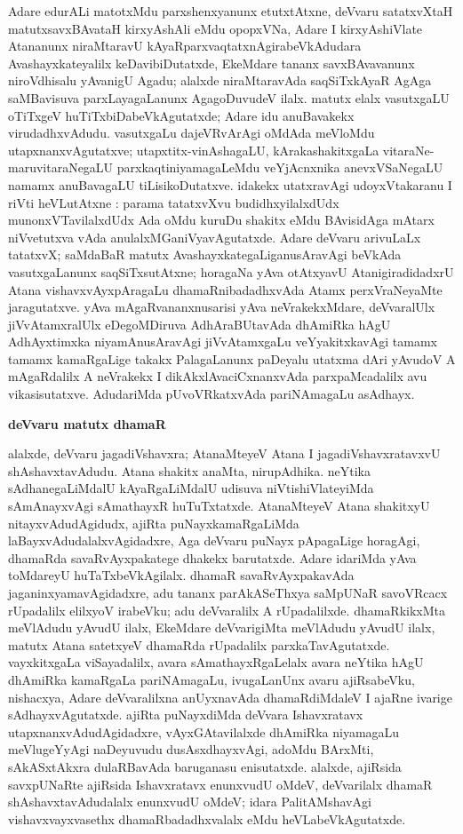 Adare edurALi matotxMdu parxshenxyanunx etutxtAtxne, deVvaru satatxvXtaH matutx\break savxBA\-vataH kirxyAshAli eMdu opopxVNa, Adare I kirxyAshiVlate Atananunx niraMta\-ravU kAyaR\-parxvaqtatxnAgirabeVkAdudara Avashayxkateyalilx keDavibiDutatxde, EkeMdare tananx savxBAvavanunx niroVdhisalu yAvanigU Agadu; alalxde niraMtaravAda saqSiTxkAyaR AgAga saMBavisuva parxLayagaLanunx AgagoDuvudeV ilalx. matutx elalx vasutxgaLU oTiTxgeV huTiTx\-biDabeVkAgutatxde; Adare idu anuBavakekx virudadhxvAdudu. vasutxgaLu dajeVRvArAgi oMdAda meVloMdu utapxnanxvAgutatxve; utapxtitx-vinAshagaLU, kArakashakitxgaLa vitaraNe-\-maruvitaraNegaLU parxkaqtiniyamagaLeMdu veYjAcnxnika anevxVSaNegaLU namamx anuBava\-gaLU tiLisikoDutatxve. idakekx utatxravAgi udoyxVtakaranu I riVti heVLutAtxne : parama tatatxvXvu budidhxyilalxdUdx munonxVTavilalxdUdx Ada oMdu kuruDu shakitx eMdu BAvisi\-dAga mAtarx niVvetutxva vAda anulalxMGaniVyavAgutatxde. Adare deVvaru arivuLaLx tatatxvX; saMdaBaR matutx AvashayxkategaLiganusAravAgi beVkAda vasutxgaLanunx saqSiTxsutAtxne; hora\-gaNa yAva otAtxyavU AtanigiradidadxrU Atana vishavxvAyxpAragaLu dhamaRnibadadhx\-vAda Atamx perxVraNeyaMte jaragutatxve. yAva mAgaRvananxnusarisi yAva neVra\-kekxMdare, deVva\-ralUlx jiVvAtamxralUlx eDegoMDiruva AdhAraBUtavAda dhAmiRka hAgU AdhAyxtimxka niyamAnusAravAgi jiVvAtamxgaLu veYyakitxkavAgi tamamx tamamx kamaRgaLige takakx Pala\-gaLanunx paDeyalu utatxma dAri yAvudoV A mAgaRdalilx A neVrakekx I dikAkxlAva\-ciCxnanxvAda parxpaMcadalilx avu vikasisutatxve. AdudariMda pUvoVRkatxvAda pariNAma\-gaLu asAdhayx.

\smallskip
\begin{center}
{\Large\bf deVvaru matutx dhamaR}
\end{center}

alalxde, deVvaru jagadiVshavxra; AtanaMteyeV Atana I jagadiVshavxratavxvU shAshavxta\-vAdudu. Atana shakitx anaMta, nirupAdhika. neYtika sAdhanegaLiMdalU kAyaRgaLiMdalU udisuva niVtishiVlateyiMda sAmAnayxvAgi sAmathayxR huTuTxtatxde. AtanaMteyeV Atana shakitxyU nitayxvAdudAgidudx, ajiRta puNayxkamaRgaLiMda laBayxvAdudalalxvAgidadxre, Aga deVvaru puNayx pApagaLige horagAgi, dhamaRda savaRvAyxpakatege dhakekx barutatxde. Adare idariMda yAva toMdareyU huTaTxbeVkAgilalx. dhamaR savaRvAyxpakavAda jaganinxyamavAgidadxre, adu tananx parAkASeThxya saMpUNaR savoVRcacx rUpadalilx elilxyoV irabeVku; adu deVvaralilx A rUpadalilxde. dhamaRkikxMta meVlAdudu yAvudU ilalx, EkeMdare deVvarigiMta meVlAdudu yAvudU ilalx, matutx Atana satetxyeV dhamaRda rUpadalilx parxkaTavAgutatxde. vayxkitxgaLa viSayadalilx, avara sAmathayxRgaLelalx avara neYtika hAgU dhAmiRka kamaRgaLa pariNAmagaLu, ivugaLanUnx avaru ajiRsabeVku, nishacxya, Adare deVvaralilxna anUyxnavAda dhamaRdiMdaleV I ajaRne ivarige sAdhayxvAgutatxde. ajiRta puNayxdiMda deVvara Ishavxratavx utapxnanxvAdudAgidadxre, vAyxGAtavilalxde dhAmiRka niyamagaLu meVlugeYyAgi naDeyuvudu dusAsxdhayxvAgi, adoMdu BArxMti, sAkASxtAkxra dulaRBavAda baruganasu enisutatxde. alalxde, ajiRsida savxpUNaRte ajiRsida Ishavxratavx enunxvudU oMdeV, deVvarilalx dhamaR shAshavxtavAdudalalx enunxvudU oMdeV; idara PalitAMshavAgi vishavxvayxvasethx dhamaRbadadhxvalalx eMdu heVLabeVkAgutatxde.

